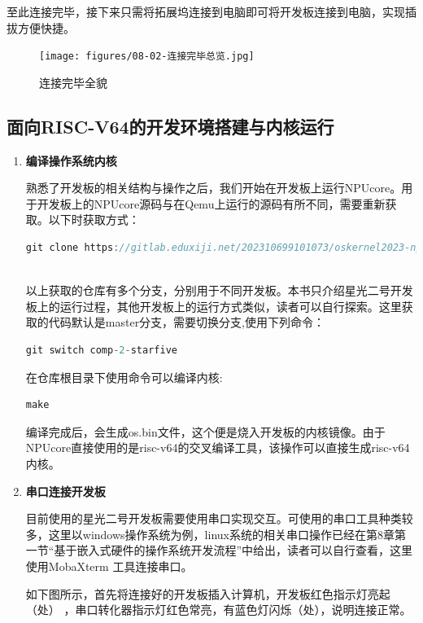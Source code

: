 至此连接完毕，接下来只需将拓展坞连接到电脑即可将开发板连接到电脑，实现插拔方便快捷。

\begin{figure}[htb]
	\centering
	\texttt{[image: figures/08-02-连接完毕总览.jpg]}
	\caption{
		连接完毕全貌
	}
	\label{fig:pipe}
\end{figure}


\subsection{面向RISC-V64的开发环境搭建与内核运行}
{
\begin{enumerate}
	\item \textbf{编译操作系统内核}
	
	熟悉了开发板的相关结构与操作之后，我们开始在开发板上运行NPUcore。用于开发板上的NPUcore源码与在Qemu上运行的源码有所不同，需要重新获取。以下时获取方式：
	
	\begin{lstlisting}[language={Rust}]
git clone https://gitlab.eduxiji.net/202310699101073/oskernel2023-npucore-plus.git
		
	\end{lstlisting}
	
	以上获取的仓库有多个分支，分别用于不同开发板。本书只介绍星光二号开发板上的运行过程，其他开发板上的运行方式类似，读者可以自行探索。这里获取的代码默认是master分支，需要切换分支,使用下列命令：
	
	\begin{lstlisting}[language={Rust}]
	git switch comp-2-starfive
	\end{lstlisting}
	
	在仓库根目录下使用命令可以编译内核:
	
	\begin{lstlisting}[language={Rust}]
	make
	\end{lstlisting}
	
	编译完成后，会生成os.bin文件，这个便是烧入开发板的内核镜像。由于NPUcore直接使用的是risc-v64的交叉编译工具，该操作可以直接生成risc-v64内核。
	
	\item \textbf{串口连接开发板}
	
	目前使用的星光二号开发板需要使用串口实现交互。可使用的串口工具种类较多，这里以windows操作系统为例，linux系统的相关串口操作已经在第8章第一节“基于嵌入式硬件的操作系统开发流程”中给出，读者可以自行查看，这里使用MobaXterm 工具连接串口。
	
	如下图所示，首先将连接好的开发板插入计算机，开发板红色指示灯亮起（处） ，串口转化器指示灯红色常亮，有蓝色灯闪烁（处），说明连接正常。
	

\end{enumerate}}
